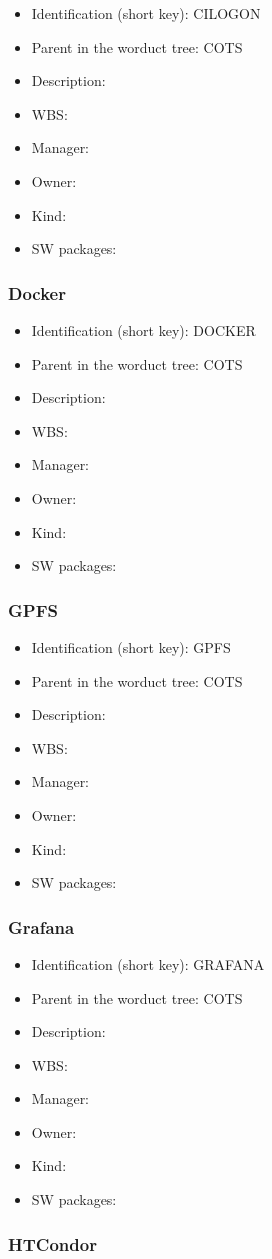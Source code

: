 \begin{itemize}\item Identification (short key): CILOGON
\item Parent in the worduct tree: COTS
\item Description: 
\item WBS: 
\item Manager: 
\item Owner: 
\item Kind:
\item SW packages: 
\end{itemize}\subsubsection{Docker}
\begin{itemize}\item Identification (short key): DOCKER
\item Parent in the worduct tree: COTS
\item Description: 
\item WBS: 
\item Manager: 
\item Owner: 
\item Kind:
\item SW packages: 
\end{itemize}\subsubsection{GPFS}
\begin{itemize}\item Identification (short key): GPFS
\item Parent in the worduct tree: COTS
\item Description: 
\item WBS: 
\item Manager: 
\item Owner: 
\item Kind:
\item SW packages: 
\end{itemize}\subsubsection{Grafana}
\begin{itemize}\item Identification (short key): GRAFANA
\item Parent in the worduct tree: COTS
\item Description: 
\item WBS: 
\item Manager: 
\item Owner: 
\item Kind:
\item SW packages: 
\end{itemize}\subsubsection{HTCondor}
